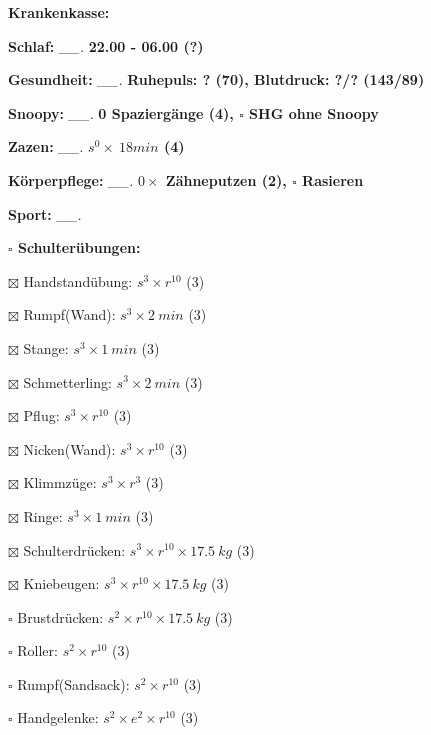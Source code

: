 \documentclass[10pt,a4paper]{article}
\newcommand\prop[1] {{\color {alizarin} {\bf #1}}}             %
\newcommand\mand[1] {{\color {burntorange} {\bf #1}}}          %
\newcommand\topspace{\vskip -15pt \hskip 20pt}
\newcommand\n[1] { {\sl #1.} \hskip 5pt }
\begin{document}
\begin{mdframed}[style=daystyle]
  \begin{labeling}{{\mand {Krankenkasse:}}}
    \setlength\itemsep{-3pt}
  \item[{\mand {Schlaf:}}]       \n{\_\_} {\prop {22.00 - 06.00 (?)}}
  \item[{\mand {Gesundheit:}}]   \n{\_\_} {\prop {Ruhepuls: ? (70), Blutdruck: ?/? (143/89)}}
  \item[{\mand {Snoopy:}}]       \n{\_\_} {\prop {0 Spaziergänge (4), $\square$ SHG ohne Snoopy}}    
  \item[{\mand {Zazen:}}]        \n{\_\_} {\prop {$s^0 \times\ 18 min$ (4)}}
  \item[{\mand {Körperpflege:}}] \n{\_\_} {\prop {$0 \times$ Zähneputzen (2), $\square$ Rasieren}}
  \item[{\mand {Sport:}}]        \n{\_\_}
    \topspace
    \begin{minipage}{0.75\textwidth}  
      \begin{labeling}{\prop {$\square$ {Schulterübungen:}}} 
        \setlength\itemsep{-3pt}
      \item[$\boxtimes$ Handstandübung:]  $s^3 \times r^{10}$ (3)
      \item[$\boxtimes$ Rumpf(Wand):]     $s^3 \times 2\ min$ (3)
      \item[$\boxtimes$ Stange:]          $s^3 \times 1\ min$ (3)
      \item[$\boxtimes$ Schmetterling:]   $s^3 \times 2\ min$ (3)
      \item[$\boxtimes$ Pflug:]           $s^3 \times r^{10}$ (3)
      \item[$\boxtimes$ Nicken(Wand):]    $s^3 \times r^{10}$ (3)
      \item[$\boxtimes$ Klimmzüge:]       $s^3 \times r^3$ (3)
      \item[$\boxtimes$ Ringe:]           $s^3 \times 1\ min$ (3)
      \item[$\boxtimes$ Schulterdrücken:] $s^3 \times r^{10} \times 17.5\ kg$ (3)
      \item[$\boxtimes$ Kniebeugen:]      $s^3 \times r^{10} \times 17.5\ kg$ (3)
      \item[$\square$ Brustdrücken:]    $s^2 \times r^{10} \times 17.5\ kg$ (3)
      \item[$\square$ Roller:]          $s^2 \times r^{10}$ (3)
      \item[$\square$ Rumpf(Sandsack):] $s^2 \times r^{10}$ (3)
      \item[$\square$ Handgelenke:]     $s^2 \times e^2 \times r^{10}$ (3)

\end{labeling}
\end{minipage}
\end{labeling}
\end{mdframed}
\end{document}
